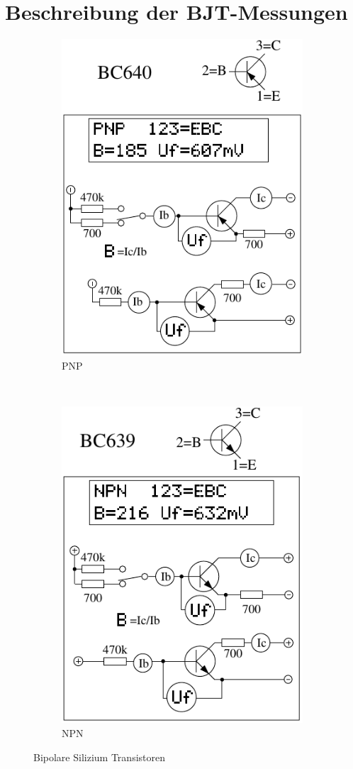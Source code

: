 \chapter{Beschreibung der BJT-Messungen}
\label{sec:BJTmeasurements}

\begin{figure}[H]
  \begin{subfigure}[b]{9cm}
    \centering
    \includegraphics[width=9cm]{../FIG/BJT_BC640.pdf}
    \caption{PNP}
    \label{fig:BJT-PNP}
  \end{subfigure}
  ~
  \begin{subfigure}[b]{9cm}
    \centering
    \includegraphics[width=9cm]{../FIG/BJT_BC639.pdf}
    \caption{NPN}
    \label{fig:BJT-NPN}
  \end{subfigure}
  \caption{Bipolare Silizium Transistoren}
\end{figure}


